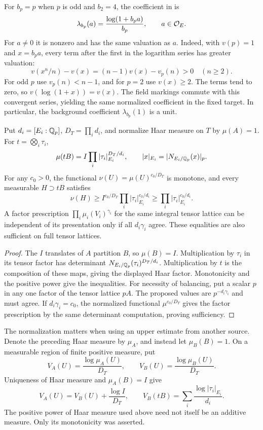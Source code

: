 For $b_p=p$ when $p$ is odd and $b_2=4$, the coefficient in
\cite[equation~(9.7.2.2)]{JoshiIII} is
\[
 \lambda_{b_p}(a)=\frac{\log(1+b_pa)}{b_p},\qquad a\in\mathcal O_E.
\]
For $a\ne0$ it is nonzero and has the same valuation as $a$.
Indeed, with $v(p)=1$ and $x=b_pa$, every term after the first in the
logarithm series has greater valuation:
\[
 v(x^n/n)-v(x)=(n-1)v(x)-v_p(n)>0\quad(n\ge2).
\]
For odd $p$ use $v_p(n)<n-1$, and for $p=2$ use $v(x)\ge2$.
The terms tend to zero, so $v(\log(1+x))=v(x)$.
The field markings commute with this convergent series, yielding the
same normalized coefficient in the fixed target. In particular, the
background coefficient $\lambda_{b_p}(1)$ is a unit.

\begin{proposition}\label{prop:balanced-volume}
Put $d_i=[E_i:\mathbb Q_p]$, $D_T=\prod_i d_i$, and normalize Haar measure
on $T$ by $\mu(A)=1$. For $t=\bigotimes_i\tau_i$,
\[
 \mu(tB)=I\prod_i|\tau_i|_{E_i}^{D_T/d_i},
 \qquad |x|_{E_i}=|N_{E_i/\mathbb Q_p}(x)|_p.
\]
For any $c_0>0$, the functional $\nu(U)=\mu(U)^{c_0/D_T}$ is monotone,
and every measurable $H\supset tB$ satisfies
\[
 \nu(H)\ge I^{c_0/D_T}\prod_i|\tau_i|_{E_i}^{c_0/d_i}
           \ge\prod_i|\tau_i|_{E_i}^{c_0/d_i}.
\]
A factor prescription
$\prod_i\mu_i(V_i)^{\gamma_i}$ for the same integral tensor lattice
can be independent of its presentation only if all $d_i\gamma_i$ agree.
These equalities are also sufficient on full tensor lattices.
\end{proposition}
\begin{proof}
The $I$ translates of $A$ partition $B$, so $\mu(B)=I$.
Multiplication by $\tau_i$ in its tensor factor has determinant
$N_{E_i/\mathbb Q_p}(\tau_i)^{D_T/d_i}$. Multiplication by $t$ is the
composition of these maps, giving the displayed Haar factor.
Monotonicity and the positive power give the inequalities.
For necessity of balancing, put a scalar $p$ in any one factor of the
tensor lattice $pA$. The proposed values are
$p^{-d_i\gamma_i}$ and must agree. If $d_i\gamma_i=c_0$, the normalized
functional $\mu^{c_0/D_T}$ gives the factor prescription by the same
determinant computation, proving sufficiency.
\end{proof}

The normalization matters when using an upper estimate from another
source. Denote the preceding Haar measure by $\mu_A$, and instead let
$\mu_B(B)=1$. On a measurable region of finite positive measure, put
\[
 V_A(U)=\frac{\log\mu_A(U)}{D_T},\qquad
 V_B(U)=\frac{\log\mu_B(U)}{D_T}.
\]
Uniqueness of Haar measure and $\mu_A(B)=I$ give
\begin{equation}\label{eq:order-normalization}
 V_A(U)=V_B(U)+\frac{\log I}{D_T},\qquad
 V_B(tB)=\sum_i\frac{\log|\tau_i|_{E_i}}{d_i}.
\end{equation}
The positive power of Haar measure used above need not itself be an
additive measure. Only its monotonicity was asserted.

